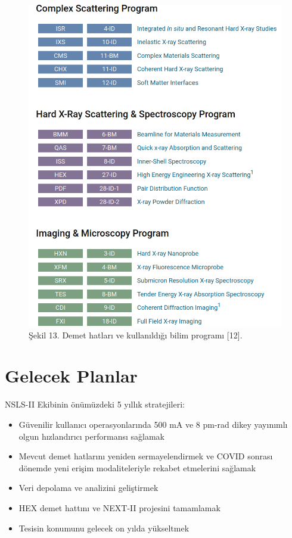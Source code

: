 \documentclass{article}
\begin{document}
\newpage

			\begin{figure}[h!]
 \centering
\includegraphics[width=12cm]{program 2.png}
\caption*{Şekil 13. Demet hatları ve kullanıldığı bilim programı [12].}
	\end{figure}


\section{Gelecek Planlar}
NSLS-II Ekibinin önümüzdeki 5 yıllık stratejileri:

\begin{itemize}
    \item Güvenilir kullanıcı operasyonlarında 500 mA ve 8 pm-rad dikey yayınımlı olgun hızlandırıcı performansı sağlamak
    \item Mevcut demet hatlarını yeniden sermayelendirmek ve COVID sonrası dönemde yeni erişim modaliteleriyle rekabet etmelerini sağlamak
    \item Veri depolama ve analizini geliştirmek
    \item HEX demet hattını ve NEXT-II projesini tamamlamak
    \item Tesisin konumunu gelecek on yılda yükseltmek
\end{itemize}
\end{document}
